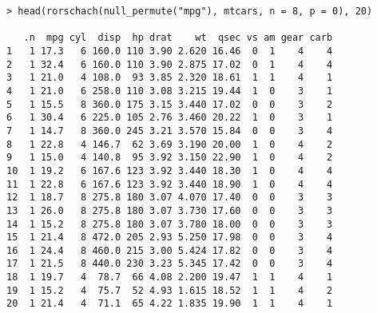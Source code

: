 \begin{verbatim}
> head(rorschach(null_permute("mpg"), mtcars, n = 8, p = 0), 20)

   .n  mpg cyl  disp  hp drat    wt  qsec vs am gear carb
1   1 17.3   6 160.0 110 3.90 2.620 16.46  0  1    4    4
2   1 32.4   6 160.0 110 3.90 2.875 17.02  0  1    4    4
3   1 21.0   4 108.0  93 3.85 2.320 18.61  1  1    4    1
4   1 21.0   6 258.0 110 3.08 3.215 19.44  1  0    3    1
5   1 15.5   8 360.0 175 3.15 3.440 17.02  0  0    3    2
6   1 30.4   6 225.0 105 2.76 3.460 20.22  1  0    3    1
7   1 14.7   8 360.0 245 3.21 3.570 15.84  0  0    3    4
8   1 22.8   4 146.7  62 3.69 3.190 20.00  1  0    4    2
9   1 15.0   4 140.8  95 3.92 3.150 22.90  1  0    4    2
10  1 19.2   6 167.6 123 3.92 3.440 18.30  1  0    4    4
11  1 22.8   6 167.6 123 3.92 3.440 18.90  1  0    4    4
12  1 18.7   8 275.8 180 3.07 4.070 17.40  0  0    3    3
13  1 26.0   8 275.8 180 3.07 3.730 17.60  0  0    3    3
14  1 15.2   8 275.8 180 3.07 3.780 18.00  0  0    3    3
15  1 21.4   8 472.0 205 2.93 5.250 17.98  0  0    3    4
16  1 24.4   8 460.0 215 3.00 5.424 17.82  0  0    3    4
17  1 21.5   8 440.0 230 3.23 5.345 17.42  0  0    3    4
18  1 19.7   4  78.7  66 4.08 2.200 19.47  1  1    4    1
19  1 15.2   4  75.7  52 4.93 1.615 18.52  1  1    4    2
20  1 21.4   4  71.1  65 4.22 1.835 19.90  1  1    4    1
\end{verbatim}


